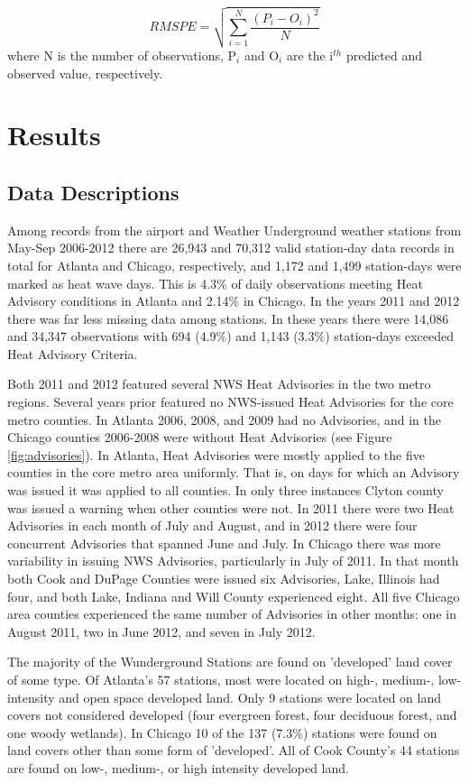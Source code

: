 \documentclass{ametsoc}
\begin{document}
\begin{equation}
RMSPE =  \sqrt{\sum_{i=1}^{N} \frac{(P_i - O_i)^2}{N}}
\label{eq:error}
\end{equation}
where N is the number of observations, P$_{i}$ and O$_{i}$ are the i$^{th}$ predicted and observed value, respectively. 

\section{Results}\label{section:results}
\subsection{Data Descriptions}\label{subsec:descriptions}
Among records from the airport and Weather Underground weather stations from May-Sep 2006-2012 there are 26,943 and 70,312 valid station-day data records in total for Atlanta and Chicago, respectively, and 1,172 and 1,499 station-days were marked as heat wave days. This is 4.3\% of daily observations meeting Heat Advisory conditions in Atlanta and 2.14\% in Chicago. In the years 2011 and 2012 there was far less missing data among stations. In these years there were 14,086 and 34,347 observations with 694 (4.9\%) and 1,143 (3.3\%) station-days exceeded Heat Advisory Criteria. 

Both 2011 and 2012 featured several NWS Heat Advisories in the two metro regions. Several years prior featured no NWS-issued Heat Advisories for the core metro counties. In Atlanta 2006, 2008, and 2009 had no Advisories, and in the Chicago counties 2006-2008 were without Heat Advisories (see Figure \ref{fig:advisories}). In Atlanta, Heat Advisories were mostly applied to the five counties in the core metro area uniformly. That is, on days for which an Advisory was issued it was applied to all counties. In only three instances Clyton county was issued a warning when other counties were not. In 2011 there were two Heat Advisories in each month of July and August, and in 2012 there were four concurrent Advisories that spanned June and July. In Chicago there was more variability in issuing NWS Advisories, particularly in July of 2011. In that month both Cook and DuPage Counties were issued six Advisories, Lake, Illinois had four, and both Lake, Indiana and Will County experienced eight. All five Chicago area counties experienced the same number of Advisories in other months: one in August 2011, two in June 2012, and seven in July 2012. 

The majority of the Wunderground Stations are found on 'developed' land cover of some type. Of Atlanta's 57 stations, most were located on high-, medium-, low-intensity and open space developed land. Only 9 stations were located on land covers not considered developed (four evergreen forest, four deciduous forest, and one woody wetlands). In Chicago 10 of the 137 (7.3\%) stations were found on land covers other than some form of 'developed'. All of Cook County's 44 stations are found on low-, medium-, or high intensity developed land.   
\end{document}
